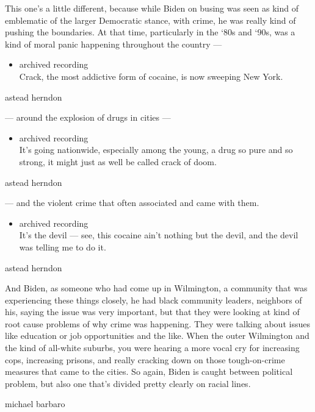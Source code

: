 This one's a little different, because while Biden on busing was seen as
kind of emblematic of the larger Democratic stance, with crime, he was
really kind of pushing the boundaries. At that time, particularly in the
`80s and `90s, was a kind of moral panic happening throughout the
country ---

\begin{itemize}
\tightlist
\item
  archived recording\\
  Crack, the most addictive form of cocaine, is now sweeping New York.
\end{itemize}

astead herndon

--- around the explosion of drugs in cities ---

\begin{itemize}
\tightlist
\item
  archived recording\\
  It's going nationwide, especially among the young, a drug so pure and
  so strong, it might just as well be called crack of doom.
\end{itemize}

astead herndon

--- and the violent crime that often associated and came with them.

\begin{itemize}
\tightlist
\item
  archived recording\\
  It's the devil --- see, this cocaine ain't nothing but the devil, and
  the devil was telling me to do it.
\end{itemize}

astead herndon

And Biden, as someone who had come up in Wilmington, a community that
was experiencing these things closely, he had black community leaders,
neighbors of his, saying the issue was very important, but that they
were looking at kind of root cause problems of why crime was happening.
They were talking about issues like education or job opportunities and
the like. When the outer Wilmington and the kind of all-white suburbs,
you were hearing a more vocal cry for increasing cops, increasing
prisons, and really cracking down on those tough-on-crime measures that
came to the cities. So again, Biden is caught between political problem,
but also one that's divided pretty clearly on racial lines.

michael barbaro

